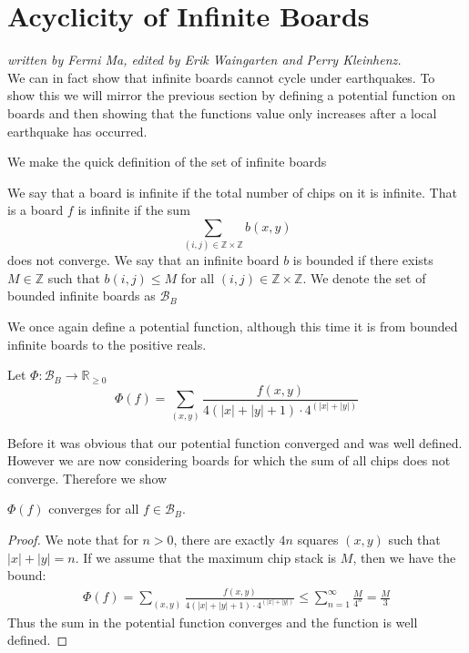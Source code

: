 \documentclass[runningheads,a4paper]{llncs}
\begin{document}
\section{Acyclicity of Infinite Boards}
\label{Acyclicity of Infinite Boards}

\emph{written by Fermi Ma, edited by Erik Waingarten and Perry Kleinhenz.}\\
We can in fact show that infinite boards cannot cycle under earthquakes. To show this we will mirror the previous section by defining a potential function on boards and then showing that the functions value only increases after a local earthquake has occurred.

We make the quick definition of the set of infinite boards
\begin{definition}
We say that a board is infinite if the total number of chips on it is infinite. That is a board $f$ is infinite if the sum 
\begin{equation*}
 \sum_{(i,j) \in \mathbb{Z} \times \mathbb{Z}} b(x,y)
\end{equation*}
does not converge. We say that an infinite board $b$ is bounded if there exists $M \in \mathbb{Z}$ such that $b(i,j) \leq M$ for all $(i,j) \in \mathbb{Z} \times \mathbb{Z}$.  We denote the set of bounded infinite boards as $\mathcal{B}_B$
\end{definition}

We once again define a potential function, although this time it is from bounded infinite boards to the positive reals. \begin{definition} Let $\Phi: \mathcal{B}_B \rightarrow \mathbb{R}_{\geq 0}$
\[ \Phi(f) = \sum_{(x,y)}\frac{f(x,y)}{4(|x|+|y|+1)\cdot4^{(|x|+|y|)}} \]
\end{definition}
Before it was obvious that our potential function converged and was well defined. However we are now considering boards for which the sum of all chips does not converge. Therefore we show 
\begin{lemma} $\Phi(f)$ converges for all $f \in \mathcal{B}_B$.
\end{lemma}
\begin{proof}
We note that for $n > 0$, there are exactly $4n$ squares $(x,y)$ such that $|x| + |y| = n$. If we assume that the maximum chip stack is $M$, then we have the bound:
\begin{align*}
\Phi(f) = \sum_{(x,y)}\frac{f(x,y)}{4(|x|+|y|+1)\cdot4^{(|x|+|y|)}} \leq \sum_{n=1}^\infty \frac{M}{4^n} = \frac{M}{3}
\end{align*}
Thus the sum in the potential function converges and the function is well defined. 
\end{proof}
\end{document}

